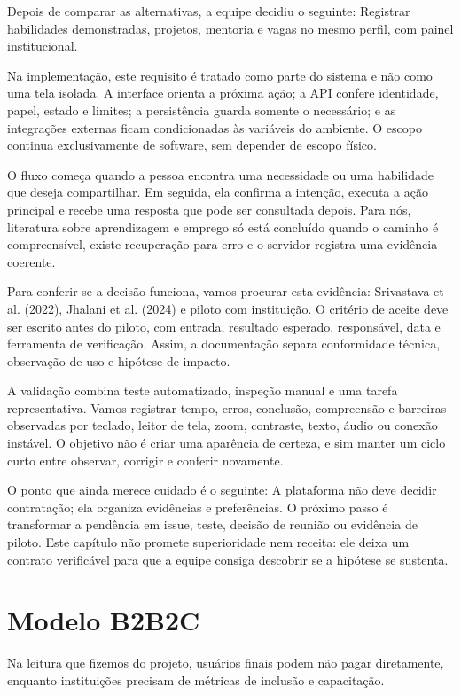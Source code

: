 \documentclass[12pt,oneside,a4paper,article]{abntex2}
\begin{document}
Depois de comparar as alternativas, a equipe decidiu o seguinte: Registrar habilidades demonstradas, projetos, mentoria e vagas no mesmo perfil, com painel institucional.

Na implementação, este requisito é tratado como parte do sistema e não como uma tela isolada. A interface orienta a próxima ação; a API confere identidade, papel, estado e limites; a persistência guarda somente o necessário; e as integrações externas ficam condicionadas às variáveis do ambiente. O escopo continua exclusivamente de software, sem depender de escopo físico.

O fluxo começa quando a pessoa encontra uma necessidade ou uma habilidade que deseja compartilhar. Em seguida, ela confirma a intenção, executa a ação principal e recebe uma resposta que pode ser consultada depois. Para nós, literatura sobre aprendizagem e emprego só está concluído quando o caminho é compreensível, existe recuperação para erro e o servidor registra uma evidência coerente.

Para conferir se a decisão funciona, vamos procurar esta evidência: Srivastava et al. (2022), Jhalani et al. (2024) e piloto com instituição. O critério de aceite deve ser escrito antes do piloto, com entrada, resultado esperado, responsável, data e ferramenta de verificação. Assim, a documentação separa conformidade técnica, observação de uso e hipótese de impacto.

A validação combina teste automatizado, inspeção manual e uma tarefa representativa. Vamos registrar tempo, erros, conclusão, compreensão e barreiras observadas por teclado, leitor de tela, zoom, contraste, texto, áudio ou conexão instável. O objetivo não é criar uma aparência de certeza, e sim manter um ciclo curto entre observar, corrigir e conferir novamente.

O ponto que ainda merece cuidado é o seguinte: A plataforma não deve decidir contratação; ela organiza evidências e preferências. O próximo passo é transformar a pendência em issue, teste, decisão de reunião ou evidência de piloto. Este capítulo não promete superioridade nem receita: ele deixa um contrato verificável para que a equipe consiga descobrir se a hipótese se sustenta.

\section{Modelo B2B2C}
Na leitura que fizemos do projeto, usuários finais podem não pagar diretamente, enquanto instituições precisam de métricas de inclusão e capacitação.
\end{document}
